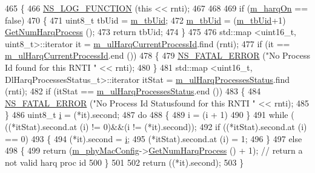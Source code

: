 \begin{DoxyCode}
465 \{
466   \hyperlink{log-macros-disabled_8h_a90b90d5bad1f39cb1b64923ea94c0761}{NS\_LOG\_FUNCTION} (\textcolor{keyword}{this} << rnti);
467 
468 
469   \textcolor{keywordflow}{if} (\hyperlink{classns3_1_1MmWaveRrMacScheduler_ad8bb79b5853000b363b42a158633a942}{m\_harqOn} == \textcolor{keyword}{false})
470   \{
471         uint8\_t tbUid = \hyperlink{classns3_1_1MmWaveRrMacScheduler_a379f6c5cc3404d41c4082879498fc38b}{m\_tbUid};
472         \hyperlink{classns3_1_1MmWaveRrMacScheduler_a379f6c5cc3404d41c4082879498fc38b}{m\_tbUid} = (\hyperlink{classns3_1_1MmWaveRrMacScheduler_a379f6c5cc3404d41c4082879498fc38b}{m\_tbUid}+1) %
      \hyperlink{classns3_1_1MmWavePhyMacCommon_a40773d84172ebeb5aff125f56ebcc5ac}{GetNumHarqProcess} ();
473         \textcolor{keywordflow}{return} tbUid;
474   \}
475 
476   std::map <uint16\_t, uint8\_t>::iterator it = \hyperlink{classns3_1_1MmWaveRrMacScheduler_a9d9d27b704770d34cb1ce158e9ed51ba}{m\_ulHarqCurrentProcessId}.find (rnti);
477   \textcolor{keywordflow}{if} (it == \hyperlink{classns3_1_1MmWaveRrMacScheduler_a9d9d27b704770d34cb1ce158e9ed51ba}{m\_ulHarqCurrentProcessId}.end ())
478     \{
479       \hyperlink{group__fatal_ga5131d5e3f75d7d4cbfd706ac456fdc85}{NS\_FATAL\_ERROR} (\textcolor{stringliteral}{"No Process Id found for this RNTI "} << rnti);
480     \}
481   std::map <uint16\_t, DlHarqProcessesStatus\_t>::iterator itStat = 
      \hyperlink{classns3_1_1MmWaveRrMacScheduler_af963cfe7e5dc36fce45c16d60b506465}{m\_ulHarqProcessesStatus}.find (rnti);
482   \textcolor{keywordflow}{if} (itStat == \hyperlink{classns3_1_1MmWaveRrMacScheduler_af963cfe7e5dc36fce45c16d60b506465}{m\_ulHarqProcessesStatus}.end ())
483     \{
484       \hyperlink{group__fatal_ga5131d5e3f75d7d4cbfd706ac456fdc85}{NS\_FATAL\_ERROR} (\textcolor{stringliteral}{"No Process Id Statusfound for this RNTI "} << rnti);
485     \}
486   uint8\_t \hyperlink{bernuolliDistribution_8m_a6f6ccfcf58b31cb6412107d9d5281426}{i} = (*it).second;
487   \textcolor{keywordflow}{do}
488     \{
489       i = (i + 1) %
490     \}
491   \textcolor{keywordflow}{while} ( ((*itStat).second.at (i) != 0)&&(i != (*it).second));
492   \textcolor{keywordflow}{if} ((*itStat).second.at (i) == 0)
493     \{
494       (*it).second = \hyperlink{bernuolliDistribution_8m_a6f6ccfcf58b31cb6412107d9d5281426}{i};
495       (*itStat).second.at (i) = 1;
496     \}
497   \textcolor{keywordflow}{else}
498     \{
499       \textcolor{keywordflow}{return} (\hyperlink{classns3_1_1MmWaveMacScheduler_a24d7af4971d2e500fe543cefbafa2fd9}{m\_phyMacConfig}->\hyperlink{classns3_1_1MmWavePhyMacCommon_a40773d84172ebeb5aff125f56ebcc5ac}{GetNumHarqProcess} () + 1); \textcolor{comment}{// return a not
       valid harq proc id}
500     \}
501 
502   \textcolor{keywordflow}{return} ((*it).second);
503 \}
\end{DoxyCode}


